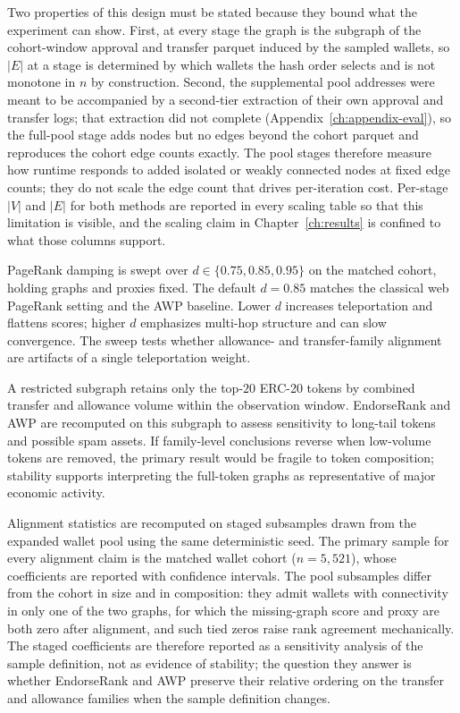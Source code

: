 Two properties of this design must be stated because they bound what the experiment can show. First, at every stage the graph is the subgraph of the cohort-window approval and transfer parquet induced by the sampled wallets, so $|E|$ at a stage is determined by which wallets the hash order selects and is not monotone in $n$ by construction. Second, the supplemental pool addresses were meant to be accompanied by a second-tier extraction of their own approval and transfer logs; that extraction did not complete (Appendix~\ref{ch:appendix-eval}), so the full-pool stage adds nodes but no edges beyond the cohort parquet and reproduces the cohort edge counts exactly. The pool stages therefore measure how runtime responds to added isolated or weakly connected nodes at fixed edge counts; they do not scale the edge count that drives per-iteration cost. Per-stage $|V|$ and $|E|$ for both methods are reported in every scaling table so that this limitation is visible, and the scaling claim in Chapter~\ref{ch:results} is confined to what those columns support.


PageRank damping is swept over $d\in\{0.75,0.85,0.95\}$ on the matched cohort, holding graphs and proxies fixed. The default $d=0.85$ matches the classical web PageRank setting  and the AWP baseline. Lower $d$ increases teleportation and flattens scores; higher $d$ emphasizes multi-hop structure and can slow convergence. The sweep tests whether allowance- and transfer-family alignment are artifacts of a single teleportation weight.


A restricted subgraph retains only the top-$20$ ERC-20 tokens by combined transfer and allowance volume within the observation window. EndorseRank and AWP are recomputed on this subgraph to assess sensitivity to long-tail tokens and possible spam assets. If family-level conclusions reverse when low-volume tokens are removed, the primary result would be fragile to token composition; stability supports interpreting the full-token graphs as representative of major economic activity.


Alignment statistics are recomputed on staged subsamples drawn from the expanded wallet pool using the same deterministic seed. The primary sample for every alignment claim is the matched wallet cohort ($n=5{,}521$), whose coefficients are reported with confidence intervals. The pool subsamples differ from the cohort in size and in composition: they admit wallets with connectivity in only one of the two graphs, for which the missing-graph score and proxy are both zero after alignment, and such tied zeros raise rank agreement mechanically. The staged coefficients are therefore reported as a sensitivity analysis of the sample definition, not as evidence of stability; the question they answer is whether EndorseRank and AWP preserve their relative ordering on the transfer and allowance families when the sample definition changes.

